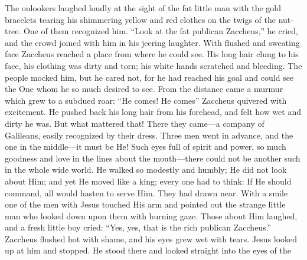 The onlookers laughed loudly at the sight of the fat little man with the gold bracelets tearing his shimmering yellow and red clothes on the twigs of the nut-tree. One of them recognized him. “Look at the fat publican Zaccheus,” he cried, and the crowd joined with him in his jeering laughter. With flushed and sweating face Zaccheus reached a place from where he could see. His long hair clung to his face, his clothing was dirty and torn; his white hands scratched and bleeding. The people mocked him, but he cared not, for he had reached his goal and could see the One whom he so much desired to see. From the distance came a murmur which grew to a subdued roar: “He comes! He comes” Zaccheus quivered with excitement. He pushed back his long hair from his forehead, and felt how wet and dirty he was. But what mattered that! There they came—a company of Galileans, easily recognized by their dress. Three men went in advance, and the one in the middle—it must be He! Such eyes full of spirit and power, so much goodness and love in the lines about the mouth—there could not be another such in the whole wide world. He walked so modestly and humbly; He did not look about Him; and yet He moved like a king; every one had to think: If He should command, all would hasten to serve Him. They had drawn near. With a smile one of the men with Jesus touched His arm and pointed out the strange little man who looked down upon them with burning gaze. Those about Him laughed, and a fresh little boy cried: “Yes, yes, that is the rich publican Zaccheus.” Zaccheus flushed hot with shame, and his eyes grew wet with tears. Jesus looked up at him and stopped. He stood there and looked straight into the eyes of the
